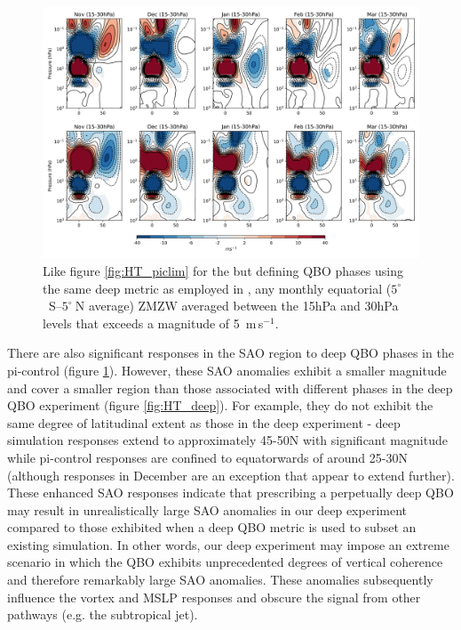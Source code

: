 \begin{figure}[h!]
\begin{center}
\noindent\includegraphics[width = \linewidth]{Figures/Figures-deepQBO/ZMZW_composites_by_month_QBO_phases_U_picontrol_MarQBO_vs_Mar_deep2hPa_5thresh.png}
\caption[ZMZW composites under different QBO phases in the pi-control simulation]{Like figure \ref{fig:HT_piclim} for the but defining QBO phases using the same deep metric as employed in \cite{andrewsObserved2019d}, any monthly equatorial ($5^{\circ}$\ S--$5^{\circ}\ $N average) ZMZW averaged between the 15hPa and 30hPa levels that exceeds a magnitude of 5\ m\,s$^{-1}$.}
\label{fig:HT_picontrol}
\end{center}
\end{figure}

There are also significant responses in the SAO region to deep QBO phases in the pi-control (figure \ref{fig:HT_picontrol}). However, these SAO anomalies exhibit a smaller magnitude and cover a smaller region than those associated with different phases in the deep QBO experiment (figure \ref{fig:HT_deep}). For example, they do not exhibit the same degree of latitudinal extent as those in the deep experiment - deep simulation responses extend to approximately 45-50N with significant magnitude while pi-control responses are confined to equatorwards of around 25-30N (although responses in December are an exception that appear to extend further). These enhanced SAO responses indicate that prescribing a perpetually deep QBO may result in unrealistically large SAO anomalies in our deep experiment compared to those exhibited when a deep QBO metric is used to subset an existing simulation. In other words, our deep experiment may impose an extreme scenario in which the QBO exhibits unprecedented degrees of vertical coherence and therefore remarkably large SAO anomalies. These anomalies subsequently influence the vortex and MSLP responses and obscure the signal from other pathways (e.g. the subtropical jet).

